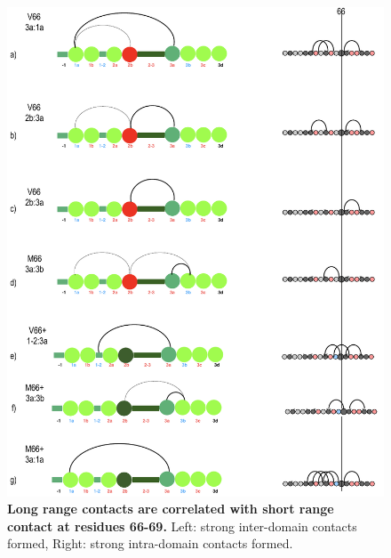 \documentclass[journal=jacsat,manuscript=article]{achemso}
\begin{document}
\begin{figure}[!ht]
\includegraphics[scale=0.5,width=12cm,trim={0 0cm 0 0cm},clip]{../figures/fig6-1.pdf}
\caption{{\bf Long range contacts are correlated with short range contact at residues 66-69.} Left: strong inter-domain contacts formed, Right: strong intra-domain contacts formed. 
 }
\label{fig6}
\end{figure}
\end{document}
